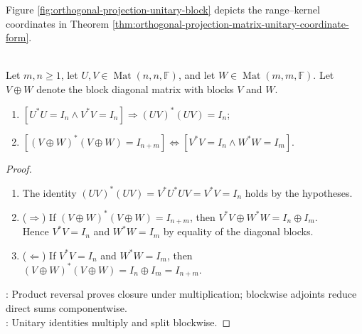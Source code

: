 Figure \ref{fig:orthogonal-projection-unitary-block} depicts the range--kernel coordinates in Theorem \ref{thm:orthogonal-projection-matrix-unitary-coordinate-form}.
\begin{illustrationfigure}[H]
  \centering
  
  \caption{Unitary coordinates make an orthogonal projection the identity on $\operatorname{col}(P)$ and zero on $\operatorname{col}(P)^\perp$.}
  \label{fig:orthogonal-projection-unitary-block}
\end{illustrationfigure}

\begin{proposition} \label{prop:algebra-of-unitary-matrices} \\
Let $m,n\geq1$, let $U,V\in\operatorname{Mat}(n,n,\mathbb{F})$, and let $W\in\operatorname{Mat}(m,m,\mathbb{F})$. Let $V\oplus W$ denote the block diagonal matrix with blocks $V$ and $W$.
\begin{enumerate}[label=(\roman*)]
\setlength{\itemsep}{0pt}
\item $[U^*U=I_n\land V^*V=I_n]\Longrightarrow(UV)^*(UV)=I_n$;
\item $[(V\oplus W)^*(V\oplus W)=I_{n+m}]\Longleftrightarrow[V^*V=I_n\land W^*W=I_m]$.
\end{enumerate}
\begin{proof}
\begin{enumerate}[label=(\roman*)]
\setlength{\itemsep}{0pt}
\item[$(i)$] The identity $(UV)^*(UV)=V^*U^*UV=V^*V=I_n$ holds by the hypotheses.
\item[$(ii)$] ($\Rightarrow$) If $(V\oplus W)^*(V\oplus W)=I_{n+m}$, then $V^*V\oplus W^*W=I_n\oplus I_m$.\\
Hence $V^*V=I_n$ and $W^*W=I_m$ by equality of the diagonal blocks.
\item[$(ii)$] ($\Leftarrow$) If $V^*V=I_n$ and $W^*W=I_m$, then $(V\oplus W)^*(V\oplus W)=I_n\oplus I_m=I_{n+m}$.
\end{enumerate}
: Product reversal proves closure under multiplication; blockwise adjoints reduce direct sums componentwise.\\
: Unitary identities multiply and split blockwise.
\end{proof}
\end{proposition}

